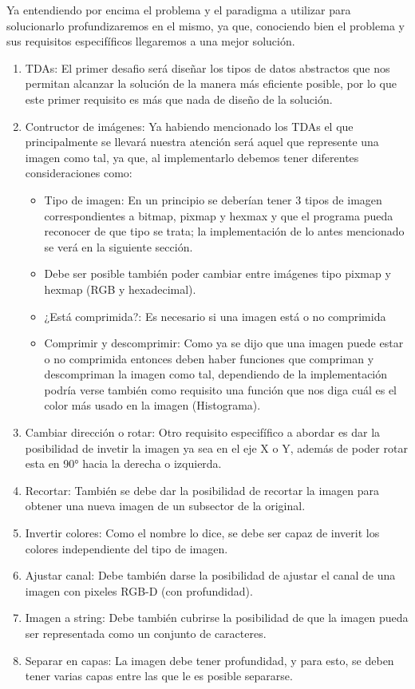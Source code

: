 Ya entendiendo  por encima el problema y el paradigma a utilizar para solucionarlo profundizaremos
 en el mismo, ya que, conociendo bien el problema y sus requisitos especifíficos llegaremos
 a una mejor solución.

\begin{enumerate}
    \item TDAs: El primer desafio será diseñar los tipos de datos abstractos que nos permitan alcanzar la solución de la manera más
    eficiente posible, por lo que este primer requisito es más que nada de diseño de la solución.
    \item Contructor de imágenes: Ya habiendo mencionado los TDAs el que principalmente se llevará nuestra atención será aquel que 
    represente una imagen como tal, ya que, al implementarlo debemos tener diferentes consideraciones como:
    \begin{itemize}
        \item Tipo de imagen: En un principio se deberían tener 3 tipos de imagen correspondientes a bitmap, pixmap y hexmax y que
        el programa pueda reconocer de que tipo se trata; la implementación de lo antes mencionado se verá en la siguiente sección.
        \item Debe ser posible también poder cambiar entre imágenes tipo pixmap y hexmap (RGB y hexadecimal).
        \item ¿Está comprimida?: Es necesario si una imagen está o no comprimida
        \item Comprimir y descomprimir: Como ya se dijo que una imagen puede estar o no comprimida entonces deben haber funciones que compriman
     y descompriman la imagen como tal, dependiendo de la implementación podría verse también como requisito una función que nos diga 
     cuál es el color más usado en la imagen (Histograma).
    \end{itemize}
    
    \item Cambiar dirección o rotar: Otro requisito especifífico a abordar es dar la posibilidad de invetir la imagen ya sea en el eje X o Y, 
    además de poder rotar esta en 90° hacia la derecha o izquierda.
    \item Recortar: También se debe dar la posibilidad de recortar la imagen para obtener una nueva imagen de un subsector de la original.
    \item Invertir colores: Como el nombre lo dice, se debe ser capaz de inverit los colores independiente del tipo de imagen.
    \item Ajustar canal: Debe también darse la posibilidad de ajustar el canal de una imagen con pixeles RGB-D (con profundidad).
    \item Imagen a string: Debe también cubrirse la posibilidad de que la imagen pueda ser representada como un conjunto de caracteres.
    \item Separar en capas: La imagen debe tener profundidad, y para esto, se deben tener varias capas entre las que le es posible separarse.
\end{enumerate}
